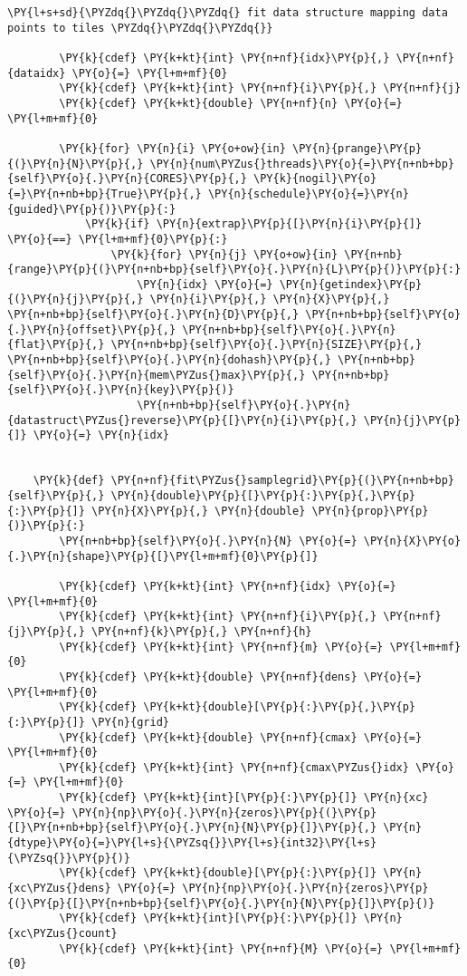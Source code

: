 \begin{Verbatim}[commandchars=\\\{\}]
        \PY{l+s+sd}{\PYZdq{}\PYZdq{}\PYZdq{} fit data structure mapping data points to tiles \PYZdq{}\PYZdq{}\PYZdq{}}

        \PY{k}{cdef} \PY{k+kt}{int} \PY{n+nf}{idx}\PY{p}{,} \PY{n+nf}{dataidx} \PY{o}{=} \PY{l+m+mf}{0}
        \PY{k}{cdef} \PY{k+kt}{int} \PY{n+nf}{i}\PY{p}{,} \PY{n+nf}{j}
        \PY{k}{cdef} \PY{k+kt}{double} \PY{n+nf}{n} \PY{o}{=} \PY{l+m+mf}{0}
        
        \PY{k}{for} \PY{n}{i} \PY{o+ow}{in} \PY{n}{prange}\PY{p}{(}\PY{n}{N}\PY{p}{,} \PY{n}{num\PYZus{}threads}\PY{o}{=}\PY{n+nb+bp}{self}\PY{o}{.}\PY{n}{CORES}\PY{p}{,} \PY{k}{nogil}\PY{o}{=}\PY{n+nb+bp}{True}\PY{p}{,} \PY{n}{schedule}\PY{o}{=}\PY{n}{guided}\PY{p}{)}\PY{p}{:}
            \PY{k}{if} \PY{n}{extrap}\PY{p}{[}\PY{n}{i}\PY{p}{]} \PY{o}{==} \PY{l+m+mf}{0}\PY{p}{:}
                \PY{k}{for} \PY{n}{j} \PY{o+ow}{in} \PY{n+nb}{range}\PY{p}{(}\PY{n+nb+bp}{self}\PY{o}{.}\PY{n}{L}\PY{p}{)}\PY{p}{:}
                    \PY{n}{idx} \PY{o}{=} \PY{n}{getindex}\PY{p}{(}\PY{n}{j}\PY{p}{,} \PY{n}{i}\PY{p}{,} \PY{n}{X}\PY{p}{,} \PY{n+nb+bp}{self}\PY{o}{.}\PY{n}{D}\PY{p}{,} \PY{n+nb+bp}{self}\PY{o}{.}\PY{n}{offset}\PY{p}{,} \PY{n+nb+bp}{self}\PY{o}{.}\PY{n}{flat}\PY{p}{,} \PY{n+nb+bp}{self}\PY{o}{.}\PY{n}{SIZE}\PY{p}{,} \PY{n+nb+bp}{self}\PY{o}{.}\PY{n}{dohash}\PY{p}{,} \PY{n+nb+bp}{self}\PY{o}{.}\PY{n}{mem\PYZus{}max}\PY{p}{,} \PY{n+nb+bp}{self}\PY{o}{.}\PY{n}{key}\PY{p}{)}
                    \PY{n+nb+bp}{self}\PY{o}{.}\PY{n}{datastruct\PYZus{}reverse}\PY{p}{[}\PY{n}{i}\PY{p}{,} \PY{n}{j}\PY{p}{]} \PY{o}{=} \PY{n}{idx}
   

    \PY{k}{def} \PY{n+nf}{fit\PYZus{}samplegrid}\PY{p}{(}\PY{n+nb+bp}{self}\PY{p}{,} \PY{n}{double}\PY{p}{[}\PY{p}{:}\PY{p}{,}\PY{p}{:}\PY{p}{]} \PY{n}{X}\PY{p}{,} \PY{n}{double} \PY{n}{prop}\PY{p}{)}\PY{p}{:}
        \PY{n+nb+bp}{self}\PY{o}{.}\PY{n}{N} \PY{o}{=} \PY{n}{X}\PY{o}{.}\PY{n}{shape}\PY{p}{[}\PY{l+m+mf}{0}\PY{p}{]}
        
        \PY{k}{cdef} \PY{k+kt}{int} \PY{n+nf}{idx} \PY{o}{=} \PY{l+m+mf}{0}
        \PY{k}{cdef} \PY{k+kt}{int} \PY{n+nf}{i}\PY{p}{,} \PY{n+nf}{j}\PY{p}{,} \PY{n+nf}{k}\PY{p}{,} \PY{n+nf}{h}
        \PY{k}{cdef} \PY{k+kt}{int} \PY{n+nf}{m} \PY{o}{=} \PY{l+m+mf}{0}
        \PY{k}{cdef} \PY{k+kt}{double} \PY{n+nf}{dens} \PY{o}{=} \PY{l+m+mf}{0}
        \PY{k}{cdef} \PY{k+kt}{double}[\PY{p}{:}\PY{p}{,}\PY{p}{:}\PY{p}{]} \PY{n}{grid}
        \PY{k}{cdef} \PY{k+kt}{double} \PY{n+nf}{cmax} \PY{o}{=} \PY{l+m+mf}{0}
        \PY{k}{cdef} \PY{k+kt}{int} \PY{n+nf}{cmax\PYZus{}idx} \PY{o}{=} \PY{l+m+mf}{0}
        \PY{k}{cdef} \PY{k+kt}{int}[\PY{p}{:}\PY{p}{]} \PY{n}{xc} \PY{o}{=} \PY{n}{np}\PY{o}{.}\PY{n}{zeros}\PY{p}{(}\PY{p}{[}\PY{n+nb+bp}{self}\PY{o}{.}\PY{n}{N}\PY{p}{]}\PY{p}{,} \PY{n}{dtype}\PY{o}{=}\PY{l+s}{\PYZsq{}}\PY{l+s}{int32}\PY{l+s}{\PYZsq{}}\PY{p}{)}
        \PY{k}{cdef} \PY{k+kt}{double}[\PY{p}{:}\PY{p}{]} \PY{n}{xc\PYZus{}dens} \PY{o}{=} \PY{n}{np}\PY{o}{.}\PY{n}{zeros}\PY{p}{(}\PY{p}{[}\PY{n+nb+bp}{self}\PY{o}{.}\PY{n}{N}\PY{p}{]}\PY{p}{)}
        \PY{k}{cdef} \PY{k+kt}{int}[\PY{p}{:}\PY{p}{]} \PY{n}{xc\PYZus{}count}
        \PY{k}{cdef} \PY{k+kt}{int} \PY{n+nf}{M} \PY{o}{=} \PY{l+m+mf}{0}


\end{Verbatim}
